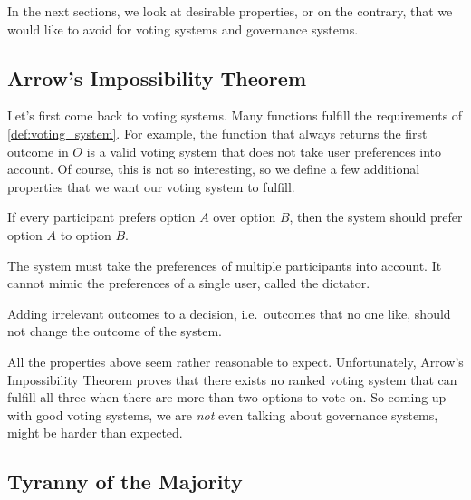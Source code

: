 In the next sections, we look at desirable properties, or on the contrary, that we would like to avoid for voting systems and governance systems.

\subsection{ Arrow's Impossibility Theorem}
\label{sec:arrow_impossibility_theorem}

Let's first come back to voting systems.
Many functions fulfill the requirements of \cref{def:voting_system}.
For example, the function that always returns the first outcome in $O$ is a valid voting system that does not take user preferences into account.
Of course, this is not so interesting, so we define a few additional properties that we want our voting system to fulfill.

\begin{property}
  \label{prop:pareto_efficiency}
  If every participant prefers option $A$ over option $B$, then the system should prefer option $A$ to option $B$.
\end{property}

\begin{property}[Nondictatorship]
  \label{prop:non_dictatorship}
  The system must take the preferences of multiple participants into account.
  It cannot mimic the preferences of a single user, called the dictator.
\end{property}

\begin{property}
  \label{prop:independence_irrelevant_alternatives}
  Adding irrelevant outcomes to a decision, i.e.\ outcomes that no one like, should not change the outcome of the system.
\end{property}

All the properties above seem rather reasonable to expect.
Unfortunately, Arrow's Impossibility Theorem \cite{noauthor_arrows_2022} proves that there exists no ranked voting system that can fulfill all three when there are more than two options to vote on.
So coming up with good voting systems, we are \emph{not} even talking about governance systems, might be harder than expected.

\subsection{Tyranny of the Majority}
\label{sec:tyranny_of_the_majority}

